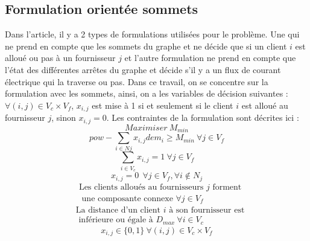 \documentclass[letterpaper]{article}
\begin{document}
\subsection{Formulation orientée sommets}
Dans l'article, il y a 2 types de formulations utilisées pour le problème. Une qui ne prend en compte que les sommets du graphe et ne décide que si un client $i$ est alloué ou pas à un fournisseur $j$ et l'autre formulation ne prend en compte que l'état des différentes arrêtes du graphe et décide s'il y a un flux de courant électrique qui la traverse ou pas.\newline\indent
Dans ce travail, on se concentre sur la formulation avec les sommets, ainsi, on a les variables de décision suivantes : $\forall (i,j) \in V_{c}\times V_{f}$, $ x_{i,j}$ est mise à 1 si et seulement si le client $i$ est alloué au fournisseur $j$, sinon $x_{i,j}=0$. Les contraintes de la formulation sont décrites ici :
\begin{equation}\label{eq:Obj}
Maximiser \ M_{min}
\end{equation}
\begin{equation}\label{eq:powDem}
pow -\sum_{i \in N{j}}{x_{i,j}dem_{i}} \geq M_{min} \ \forall j \in V_{f}
\end{equation}
\begin{equation}\label{eq:oneFeeder}
\sum_{i \in V_{c}}{x_{i,j}}=1 \ \forall j \in V_{f}
\end{equation}
\begin{equation}\label{eq:N_j}
x_{i,j}=0 \ \ \forall j \in V_{f},\forall i \notin N_{j}
\end{equation}
\begin{equation}
\begin{aligned}\label{eq:connect}
&\mbox{Les clients alloués au fournisseurs $j$ forment}\\
&\mbox{ une composante connexe }  \forall j \in V_{f}
\end{aligned}
\end{equation}
\begin{equation}\label{eq:dist}
\begin{aligned}
&\mbox{La distance d'un client $i$ à son fournisseur est}\\ 
&\mbox{ inférieure ou égale à } D_{max} \ \forall i \in V_{c}
\end{aligned}
\end{equation}
\begin{equation}\label{eq:0_1}
x_{i,j} \in \{0,1 \} \ \forall (i,j) \in V_{c}\times V_{f}
\end{equation}
\end{document}
